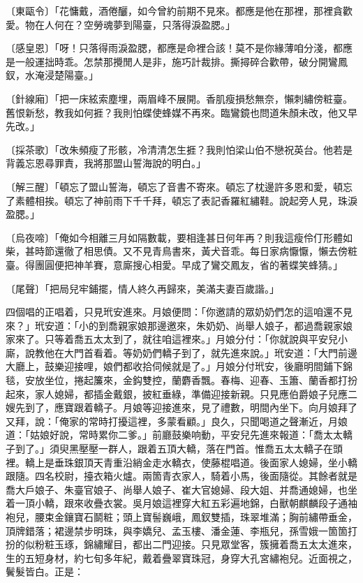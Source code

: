 \begin{showcontents}{}
〔東甌令〕「花慵戴，酒倦釃，如今曾約前期不見來。都應是他在那裡，那裡貪歡愛。物在人何在？空勞魂夢到陽臺，只落得淚盈腮。」

〔感皇恩〕「呀！只落得雨淚盈腮，都應是命裡合該！莫不是你緣薄咱分淺，都應是一般運拙時乖。怎禁那攪閒人是非，施巧計裁排。撕撏碎合歡帶，破分開鸞鳳釵，水淹浸楚陽臺。」

〔針線廂〕「把一床絃索塵埋，兩眉峰不展開。香肌瘦損愁無奈，懶刺繡傍粧臺。舊恨新愁，教我如何捱？我則怕蝶使蜂媒不再來。臨鸞鏡也問道朱顏未改，他又早先改。」

〔採茶歌〕「改朱頻瘦了形骸，冷清清怎生捱？我則怕梁山伯不戀祝英台。他若是背義忘恩尋罪責，我將那盟山誓海說的明白。」

〔解三醒〕「頓忘了盟山誓海，頓忘了音書不寄來。頓忘了枕邊許多恩和愛，頓忘了素體相挨。頓忘了神前雨下千千拜，頓忘了表記香羅紅繡鞋。說起旁人見，珠淚盈腮。」

〔烏夜啼〕「俺如今相離三月如隔數載，要相逢甚日何年再？則我這瘦伶仃形體如柴，甚時節還徹了相思債。又不見青鳥書來，黃犬音乖。每日家病懨懨，懶去傍粧臺。得團圓便把神羊賽，意廝搜心相愛。早成了鸞交鳳友，省的著蝶笑蜂猜。」

〔尾聲〕「把局兒牢鋪擺，情人終久再歸來，美滿夫妻百歲諧。」

四個唱的正唱着，只見玳安進來。月娘便問：「你邀請的眾奶奶們怎的這咱還不見來？」玳安道：「小的到喬親家娘那邊邀來，朱奶奶、尚舉人娘子，都過喬親家娘家來了。只等着喬五太太到了，就往咱這裡來。」月娘分付：「你就說與平安兒小廝，說教他在大門首看着。等奶奶們轎子到了，就先進來說。」玳安道：「大門前邊大廳上，鼓樂迎接哩，娘們都收拾伺候就是了。」月娘分付玳安，後廳明間鋪下錦毯，安放坐位，捲起簾來，金鈎雙控，蘭麝香飄。春梅、迎春、玉簫、蘭香都打扮起來，家人媳婦，都插金戴銀，披紅垂綠，準備迎接新親。只見應伯爵娘子兒應二嫂先到了，應寶跟着轎子。月娘等迎接進來，見了禮數，明間內坐下。向月娘拜了又拜，說：「俺家的常時打擾這裡，多蒙看顧。」良久，只聞喝道之聲漸近，月娘道：「姑娘好說，常時累你二爹。」前廳鼓樂响動，平安兒先進來報道：「喬太太轎子到了。」須臾黑壓壓一群人，跟着五頂大轎，落在門首。惟喬五太太轎子在頭裡。轎上是垂珠銀頂天青重沿綃金走水轎衣，使藤棍唱道。後面家人媳婦，坐小轎跟隨。四名校尉，擡衣箱火爐。兩箇青衣家人，騎着小馬，後面隨從。其餘者就是喬大戶娘子、朱臺官娘子、尚舉人娘子、崔大官媳婦、段大姐、并喬通媳婦，也坐着一頂小轎，跟來收疊衣裳。吳月娘這裡穿大紅五彩遍地錦，白獸朝麒麟段子通袖袍兒，腰束金鑲寶石鬬粧；頭上寶髻巍峨，鳳釵雙插，珠翠堆滿；胸前繡帶垂金，頂牌錯落；裙邊禁步明珠，與李嬌兒、孟玉樓、潘金蓮、李瓶兒，孫雪娥一箇箇打扮的似粉粧玉琢，錦繡耀目，都出二門迎接。只見眾堂客，簇擁着喬五太太進來，生的五短身材，約七旬多年紀，戴着疊翠寶珠冠，身穿大孔宮繡袍兒。近面視之，鬢髮皆白。正是：


\end{showcontents}

